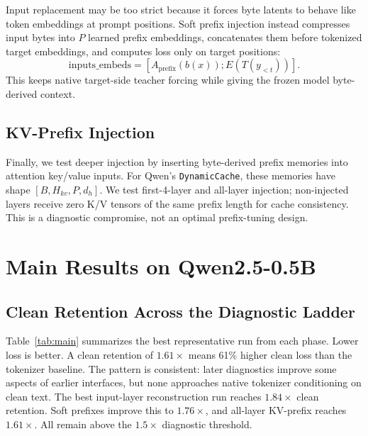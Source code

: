 \documentclass[runningheads]{llncs}
\begin{document}
Input replacement may be too strict because it forces byte latents to behave like token embeddings at prompt positions. Soft prefix injection instead compresses input bytes into $P$ learned prefix embeddings, concatenates them before tokenized target embeddings, and computes loss only on target positions:
\begin{equation}
    \mathrm{inputs\_embeds} = [A_{\mathrm{prefix}}(b(x)); E(T(y_{<t}))].
\end{equation}
This keeps native target-side teacher forcing while giving the frozen model byte-derived context.

\subsection{KV-Prefix Injection}

Finally, we test deeper injection by inserting byte-derived prefix memories into attention key/value inputs. For Qwen's \texttt{DynamicCache}, these memories have shape $[B,H_{kv},P,d_h]$. We test first-4-layer and all-layer injection; non-injected layers receive zero K/V tensors of the same prefix length for cache consistency. This is a diagnostic compromise, not an optimal prefix-tuning design.

\section{Main Results on Qwen2.5-0.5B}

\subsection{Clean Retention Across the Diagnostic Ladder}

Table~\ref{tab:main} summarizes the best representative run from each phase. Lower loss is better. A clean retention of $1.61\times$ means 61\% higher clean loss than the tokenizer baseline. The pattern is consistent: later diagnostics improve some aspects of earlier interfaces, but none approaches native tokenizer conditioning on clean text. The best input-layer reconstruction run reaches $1.84\times$ clean retention. Soft prefixes improve this to $1.76\times$, and all-layer KV-prefix reaches $1.61\times$. All remain above the $1.5\times$ diagnostic threshold.
\end{document}

